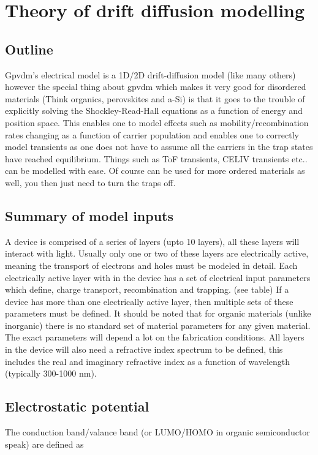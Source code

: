 \chapter{Theory of drift diffusion modelling}
\label{sec:electrical}

\section{Outline}
Gpvdm's electrical model is a 1D/2D drift-diffusion model (like many others) however the special thing about gpvdm which makes it very good for disordered materials (Think organics, perovskites and a-Si) is that it goes to the trouble of explicitly solving the Shockley-Read-Hall equations as a function of energy and position space.  This enables one to model effects such as mobility/recombination rates changing as a function of carrier population and enables one to correctly model transients as one does not have to assume all the carriers in the trap states have reached equilibrium.  Things such as ToF transients, CELIV transients etc.. can be modelled with ease. Of course can be used for more ordered materials as well, you then just need to turn the traps off.

\section{Summary of model inputs}
A device is comprised of a series of layers (upto 10 layers), all these layers will interact with light.  Usually only one or two of these layers are electrically active, meaning the transport of electrons and holes must be modeled in detail.  Each electrically active layer with in the device has a set of electrical input parameters which define, charge transport, recombination and trapping. (see table)  If a device has more than one electrically active layer, then multiple sets of these parameters must be defined.  It should be noted that for organic materials (unlike inorganic) there is no standard set of material parameters for any given material.  The exact parameters will depend a lot on the fabrication conditions.  All layers in the device will also need a refractive index spectrum to be defined, this includes the real and imaginary refractive index as a function of wavelength (typically 300-1000 nm).
 

\section{Electrostatic potential}
The conduction band/valance band (or LUMO/HOMO in organic semiconductor speak) are defined as

